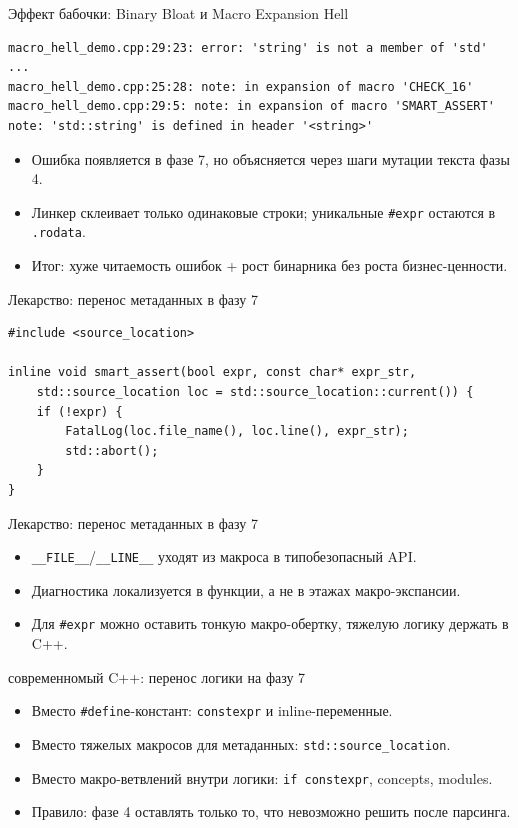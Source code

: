 \documentclass{beamer}
\begin{document}
\begin{frame}[fragile]{Эффект бабочки: Binary Bloat и Macro Expansion Hell}
    \begin{lstlisting}
macro_hell_demo.cpp:29:23: error: 'string' is not a member of 'std'
...
macro_hell_demo.cpp:25:28: note: in expansion of macro 'CHECK_16'
macro_hell_demo.cpp:29:5: note: in expansion of macro 'SMART_ASSERT'
note: 'std::string' is defined in header '<string>'
    \end{lstlisting}
    \begin{itemize}
        \item Ошибка появляется в фазе 7, но объясняется через шаги мутации текста фазы 4.
        \item Линкер склеивает только одинаковые строки; уникальные \texttt{\#expr} остаются в \texttt{.rodata}.
        \item Итог: хуже читаемость ошибок + рост бинарника без роста бизнес-ценности.
    \end{itemize}
\end{frame}

\begin{frame}[fragile]{Лекарство: перенос метаданных в фазу 7}
\begin{lstlisting}
#include <source_location>

inline void smart_assert(bool expr, const char* expr_str,
    std::source_location loc = std::source_location::current()) {
    if (!expr) {
        FatalLog(loc.file_name(), loc.line(), expr_str);
        std::abort();
    }
}
\end{lstlisting}
\end{frame}

\begin{frame}[fragile]{Лекарство: перенос метаданных в фазу 7}
    \begin{itemize}
        \item \texttt{\_\_FILE\_\_}/\texttt{\_\_LINE\_\_} уходят из макроса в типобезопасный API.
        \item Диагностика локализуется в функции, а не в этажах макро-экспансии.
        \item Для \texttt{\#expr} можно оставить тонкую макро-обертку, тяжелую логику держать в C++.
    \end{itemize}
\end{frame}

\begin{frame}{современномый C++: перенос логики на фазу 7}
    \begin{itemize}
        \item Вместо \texttt{\#define}-констант: \texttt{constexpr} и inline-переменные.
        \item Вместо тяжелых макросов для метаданных: \texttt{std::source\_location}.
        \item Вместо макро-ветвлений внутри логики: \texttt{if constexpr}, concepts, modules.
        \item Правило: фазе 4 оставлять только то, что невозможно решить после парсинга.
    \end{itemize}
\end{frame}
\end{document}
